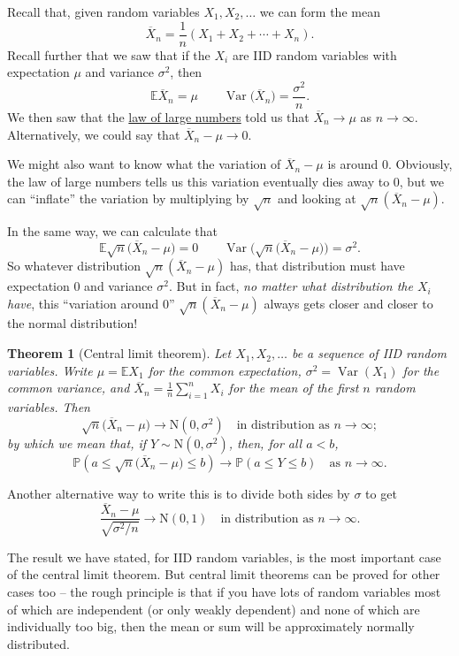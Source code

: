 \documentclass[
  a4paper,
]{book}
\newtheorem{theorem}{Theorem}[chapter]
\theoremstyle{definition}
\theoremstyle{definition}
\theoremstyle{definition}
\theoremstyle{definition}
\theoremstyle{remark}
\begin{document}
Recall that, given random variables \(X_1, X_2, \dots\) we can form the mean
\[ \overline X_n = \frac{1}{n} (X_1 + X_2 + \cdots + X_n) . \]
Recall further that we saw that if the \(X_i\) are IID random variables with expectation \(\mu\) and variance \(\sigma^2\), then
\[ \mathbb E\overline X_n = \mu \qquad \operatorname{Var}\big(\overline X_n\big) = \frac{\sigma^2}{n} . \]
We then saw that the \protect\hyperlink{lln}{law of large numbers} told us that \(\overline X_n \to \mu\) as \(n \to \infty\). Alternatively, we could say that \(\overline X_n - \mu \to 0\).

We might also want to know what the variation of \(\overline X_n - \mu\) is around 0. Obviously, the law of large numbers tells us this variation eventually dies away to 0, but we can ``inflate'' the variation by multiplying by \(\sqrt{n}\) and looking at \(\sqrt{n}(\overline X_n - \mu)\).

In the same way, we can calculate that
\[ \mathbb E\sqrt{n}\big( \overline X_n - \mu\big) = 0 \qquad \operatorname{Var}\Big(\sqrt{n}\big( \overline X_n - \mu\big)\Big) = \sigma^2. \]
So whatever distribution \(\sqrt{n}(\overline X_n - \mu)\) has, that distribution must have expectation \(0\) and variance \(\sigma^2\). But in fact, \emph{no matter what distribution the \(X_i\) have}, this ``variation around 0'' \(\sqrt{n}(\overline X_n - \mu)\) always gets closer and closer to the normal distribution!

\begin{theorem}[Central limit theorem]
\protect\hypertarget{thm:thLLN}{}\label{thm:thLLN}Let \(X_1, X_2, \dots\) be a sequence of IID random variables. Write \(\mu = \mathbb EX_1\) for the common expectation, \(\sigma^2 = \operatorname{Var}(X_1)\) for the common variance, and \(\overline X_n =\frac{1}{n} \sum_{i=1}^n X_i\) for the mean of the first \(n\) random variables. Then
\[ \sqrt{n}\big(\overline X_n - \mu\big) \to \mathrm N(0, \sigma^2) \quad \text{in distribution as $n \to \infty$}; \]
by which we mean that, if \(Y \sim \mathrm N(0, \sigma^2)\), then, for all \(a < b\),
\[ \mathbb P\left(a \leq \sqrt{n}\big(\overline X_n - \mu\big) \leq b \right) \to \mathbb P(a \leq Y \leq b) \quad \text{as $n\to\infty$.} \]
\end{theorem}

Another alternative way to write this is to divide both sides by \(\sigma\) to get
\[ \frac{\overline X_n - \mu}{\sqrt{\sigma^2/n}} \to \mathrm N(0, 1) \quad \text{in distribution as $n \to \infty$}. \]

The result we have stated, for IID random variables, is the most important case of the central limit theorem. But central limit theorems can be proved for other cases too -- the rough principle is that if you have lots of random variables most of which are independent (or only weakly dependent) and none of which are individually too big, then the mean or sum will be approximately normally distributed.
\end{document}
